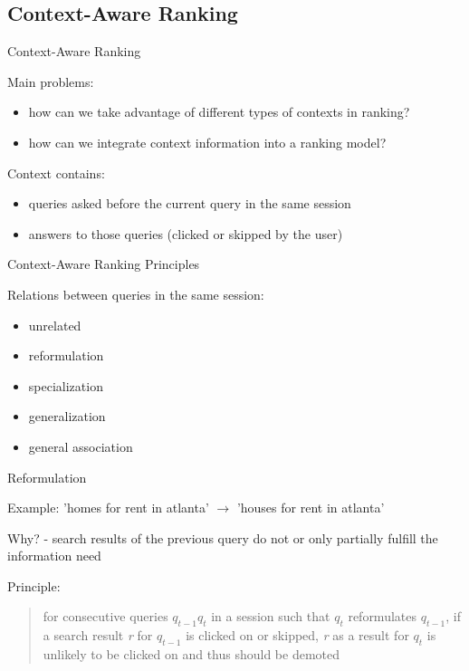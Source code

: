 \subsection{Context-Aware Ranking}


\begin{frame}{Context-Aware Ranking}

Main problems:
\begin{itemize}
	\item how can we take advantage of different types of contexts in ranking?
	\item how can we integrate context information into a ranking model? \newline
\end{itemize}

Context contains:
\begin{itemize}
	\item queries asked before the current query in the same session
	\item answers to those queries (clicked or skipped by the user) \newline
\end{itemize}

\end{frame}


\begin{frame}{Context-Aware Ranking Principles}

Relations between queries in the same session:
\begin{itemize}
	\item unrelated
	\item reformulation
	\item specialization
	\item generalization
	\item general association
\end{itemize}

\end{frame}


\begin{frame}{Reformulation}

Example: \newline
'homes for rent in atlanta' $ \rightarrow $ 'houses for rent in atlanta' \newline

Why? \newline
- search results of the previous query do not or only partially fulfill the information need \newline

Principle:
\begin{quotation}
for consecutive queries $ q_{t-1}q_{t} $ in a session such that $ q_{t} $ reformulates $ q_{t-1} $, if a search result \emph{r} for $ q_{t-1} $ is clicked on or skipped, \emph{r} as a result for $ q_{t} $ is unlikely to be clicked on and thus should be demoted
\end{quotation}

\end{frame}


